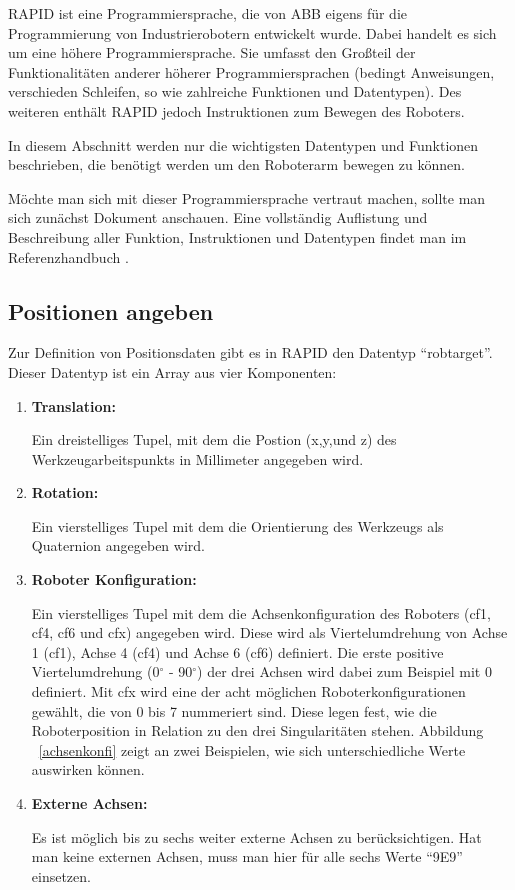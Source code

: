 RAPID ist eine Programmiersprache, die von ABB eigens für die Programmierung von Industrierobotern entwickelt wurde. Dabei handelt es sich um eine höhere Programmiersprache. Sie umfasst den Großteil der Funktionalitäten anderer höherer Programmiersprachen (bedingt Anweisungen, verschieden Schleifen, so wie zahlreiche Funktionen und Datentypen). Des weiteren enthält RAPID jedoch Instruktionen zum Bewegen des Roboters.

In diesem Abschnitt werden nur die wichtigsten Datentypen und Funktionen beschrieben, die benötigt werden um den Roboterarm bewegen zu können. 

Möchte man sich mit dieser Programmiersprache vertraut machen, sollte man sich zunächst Dokument \cite{rapid1} anschauen. Eine vollständig Auflistung und Beschreibung aller Funktion, Instruktionen und Datentypen findet man im Referenzhandbuch \cite{rapid2}.

\subsection{Positionen angeben}
\label{ropbtargetsection}
Zur Definition von Positionsdaten gibt es in RAPID den Datentyp \enquote{robtarget}. Dieser Datentyp ist ein Array aus vier Komponenten:
\begin{enumerate}
\item \textbf{Translation:}

Ein dreistelliges Tupel, mit dem die Postion (x,y,und z) des Werkzeugarbeitspunkts in Millimeter angegeben wird.
\item \textbf{Rotation:}

Ein vierstelliges Tupel mit dem die Orientierung des Werkzeugs als Quaternion angegeben wird.

\item \textbf{Roboter Konfiguration:}

Ein vierstelliges Tupel mit dem die Achsenkonfiguration des Roboters (cf1, cf4, cf6 und cfx) angegeben wird. Diese wird als Viertelumdrehung von Achse 1 (cf1), Achse 4 (cf4) und Achse 6 (cf6) definiert. Die erste positive Viertelumdrehung (0$ ^\circ $ - 90$ ^\circ $) der drei Achsen wird dabei zum Beispiel mit 0 definiert. Mit cfx wird eine der acht möglichen Roboterkonfigurationen gewählt, die von 0 bis 7 nummeriert sind. Diese legen fest, wie die Roboterposition in Relation zu den drei Singularitäten stehen. Abbildung ~\ref{achsenkonfi} zeigt an zwei Beispielen, wie sich unterschiedliche Werte auswirken können.  
\item \textbf{Externe Achsen:}

Es ist möglich bis zu sechs weiter externe Achsen zu berücksichtigen. Hat man keine externen Achsen, muss man hier für alle sechs Werte \enquote{9E9} einsetzen. 
\end{enumerate} 

